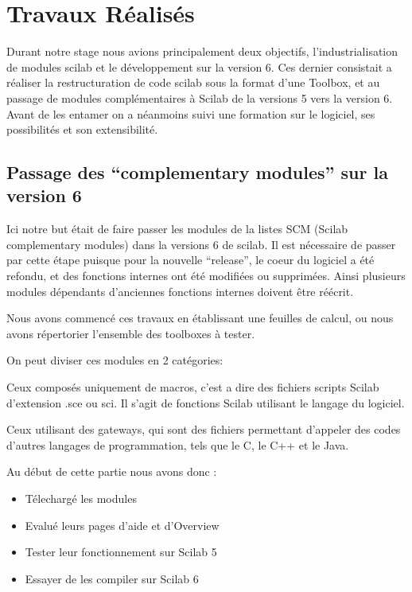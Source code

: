 \section*{Travaux Réalisés}

Durant notre stage nous avions principalement deux objectifs,
l’industrialisation de modules scilab et le développement sur
la version 6.
Ces dernier consistait a réaliser la restructuration de code scilab sous
la format d’une Toolbox, et au passage de modules complémentaires
à Scilab de la versions 5 vers la version 6.
Avant de les entamer on a néanmoins suivi une formation sur le logiciel,
ses possibilités et son extensibilité.



\subsection*{Passage des ``complementary modules'' sur la version 6}

Ici notre but était de faire passer les modules de la listes SCM (Scilab complementary modules) dans la versions 6 de scilab. Il est nécessaire de passer par cette étape puisque pour la nouvelle “release”, le coeur du logiciel a été refondu, et des fonctions internes ont été modifiées ou supprimées. Ainsi plusieurs modules dépendants d’anciennes fonctions internes doivent être réécrit.

Nous avons commencé ces travaux en établissant une feuilles de calcul, ou nous avons répertorier l’ensemble des toolboxes à tester.

On peut diviser ces modules en 2 catégories:

Ceux composés uniquement de macros, c’est a dire des fichiers scripts Scilab d’extension .sce ou sci. Il s’agit de fonctions Scilab utilisant le langage du logiciel.

Ceux utilisant des gateways, qui sont des fichiers permettant d’appeler des codes d’autres langages de programmation, tels que le C, le C++ et le Java.

Au début de cette partie nous avons donc :

\begin{itemize}
\item Télechargé les modules
\item Evalué leurs pages d’aide et d’Overview
\item Tester leur fonctionnement sur Scilab 5
\item Essayer de les compiler sur Scilab 6
\end{itemize}

